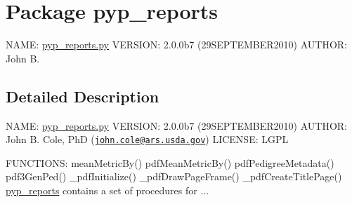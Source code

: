 \hypertarget{namespacepyp__reports}{
\section{Package pyp\_\-reports}
\label{namespacepyp__reports}
}


NAME: \hyperlink{pyp__reports_8py_source}{pyp\_\-reports.py} VERSION: 2.0.0b7 (29SEPTEMBER2010) AUTHOR: John B.  




\subsection{Detailed Description}
NAME: \hyperlink{pyp__reports_8py_source}{pyp\_\-reports.py} VERSION: 2.0.0b7 (29SEPTEMBER2010) AUTHOR: John B. Cole, PhD (\href{mailto:john.cole@ars.usda.gov}{\tt john.cole@ars.usda.gov}) LICENSE: LGPL

FUNCTIONS: meanMetricBy() pdfMeanMetricBy() pdfPedigreeMetadata() pdf3GenPed() \_\-pdfInitialize() \_\-pdfDrawPageFrame() \_\-pdfCreateTitlePage() \hyperlink{namespacepyp__reports}{pyp\_\-reports} contains a set of procedures for ... 